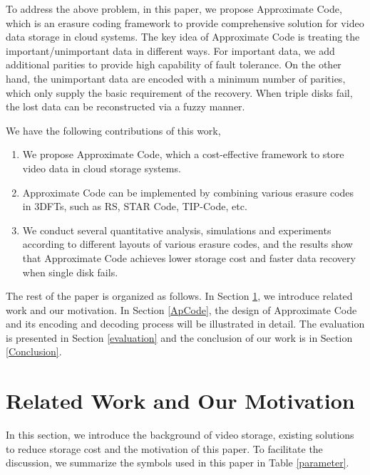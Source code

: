 \documentclass[sigconf]{acmart}
\begin{document}
To address the above problem, in this paper, we propose Approximate Code, which is an erasure coding framework to provide comprehensive solution for video data storage in cloud systems. The key idea of Approximate Code is treating the important/unimportant data in different ways. For important data, we add additional parities to provide high capability of fault tolerance. On the other hand, the unimportant data are encoded with a minimum number of parities, which only supply the basic requirement of the recovery. When triple disks fail, the lost data can be reconstructed via a fuzzy manner.

We have the following contributions of this work,
\begin{enumerate}
\item We propose Approximate Code, which a cost-effective framework to store video data in cloud storage systems.
\item Approximate Code can be implemented by combining various erasure codes in 3DFTs, such as RS, STAR Code, TIP-Code, etc.
\item We conduct several quantitative analysis, simulations and experiments according to different layouts of various erasure codes, and the results show that Approximate Code achieves lower storage cost and faster data recovery when single disk fails.
\end{enumerate}

The rest of the paper is organized as follows. In Section \ref{RelatedWork}, we introduce related work and our motivation. 
In Section \ref{ApCode}, the design of Approximate Code and its encoding and decoding process will be illustrated in detail. 
The evaluation is presented in Section \ref{evaluation} and the conclusion of our work is in Section \ref{Conclusion}. 

\section{Related Work and Our Motivation}\label{RelatedWork}
In this section, we introduce the background of video storage, existing solutions to reduce storage cost and the motivation of this paper.
To facilitate the discussion, we summarize the symbols used in this paper in Table \ref{parameter}.
\end{document}
